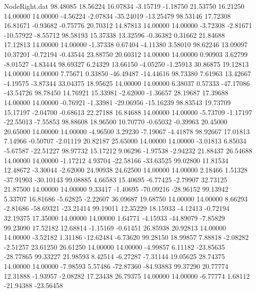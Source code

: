 \begin{filecontents}{NodeRight.dat}
  98.48085   18.56224   16.07834    -3.15719   -1.18750   21.53750   16.21250   14.00000   14.00000   -4.56224   -2.07834  -35.24019  -13.25479
  98.53146   17.72308   16.81671    -0.93682   -0.75776   20.70312   14.87813   14.00000   14.00000   -3.72308   -2.81671  -10.57922   -8.55712
  98.58193   15.37338   13.32596    -0.36382    0.31662   21.84688   17.12813   14.00000   14.00000   -1.37338    0.67404   -4.11380    3.58010
  98.62246   13.09097   10.37201    -0.72194   -0.43544   23.88750   20.60312   14.00000   14.00000    0.90903    3.62799   -8.01527   -4.83444
  98.69327    6.24329   13.66150    -4.05250   -1.25913   30.86875   19.12813   14.00000   14.00000    7.75671    0.33850  -46.49487  -14.44616
  98.73380    7.61963   13.42667    -4.19575   -3.87344   33.04375   18.95625   14.00000   14.00000    6.38037    0.57333  -47.17086  -43.54726
  98.78450   14.76921   15.33981    -2.62000   -1.36657   28.19687   17.39688   14.00000   14.00000   -0.76921   -1.33981  -29.06956  -15.16239
  98.83543   19.73709   15.17197    -2.04700   -0.68613   22.27188   16.84688   14.00000   14.00000   -5.73709   -1.17197  -22.55013   -7.55853
  98.88608   18.96500   10.70770    -0.65032   -0.39963   20.45000   20.65000   14.00000   14.00000   -4.96500    3.29230   -7.19067   -4.41878
  98.92667   17.01813    7.14966    -0.50707   -2.01119   20.82187   25.65000   14.00000   14.00000   -3.01813    6.85034   -5.67587  -22.51227
  98.97732   15.17212    9.06296    -1.97538   -2.94232   21.88437   26.54688   14.00000   14.00000   -1.17212    4.93704  -22.58166  -33.63525
  99.02800   11.81534   12.48672    -3.30044   -2.62000   24.90938   24.62500   14.00000   14.00000    2.18466    1.51328  -37.91903  -30.10143
  99.08885    4.66583   15.40695    -6.77425   -2.79907   32.73125   21.87500   14.00000   14.00000    9.33417   -1.40695  -70.09216  -28.96152
  99.13942    5.33707   16.81686    -5.62825   -2.22607   36.09687   19.68750   14.00000   14.00000    8.66293   -2.81686  -58.69321  -23.21414
  99.19011   12.35229   18.15933    -4.12413   -0.72194   32.19375   17.35000   14.00000   14.00000    1.64771   -4.15933  -44.89079   -7.85829
  99.23090   17.52182   12.68814    -1.15169   -0.61451   26.85938   20.92813   14.00000   14.00000   -3.52182    1.31186  -12.62484   -6.73620
  99.28150   18.99857    7.88818    -2.08282   -2.51257   23.61250   26.61250   14.00000   14.00000   -4.99857    6.11182  -23.85635  -28.77865
  99.33227   21.98593    8.42514    -6.27287   -7.31144   19.05625   28.74375   14.00000   14.00000   -7.98593    5.57486  -72.87360  -84.93883
  99.37290   20.77774   12.31888    -1.93957   -2.08282   17.23438   26.79375   14.00000   14.00000   -6.77774    1.68112  -21.94388  -23.56458

\end{filecontents}
